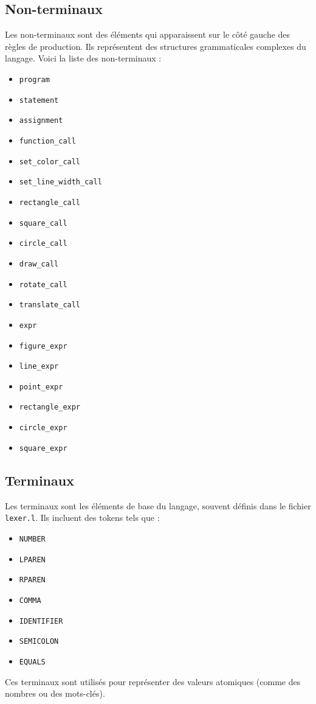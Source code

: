 \documentclass[12pt,a4paper]{article}
\begin{document}
\subsection{Non-terminaux}
Les non-terminaux sont des éléments qui apparaissent sur le côté gauche des règles de production. Ils représentent des structures grammaticales complexes du langage. Voici la liste des non-terminaux :
\begin{itemize}
    \item \texttt{program}
    \item \texttt{statement}
    \item \texttt{assignment}
    \item \texttt{function\_call}
    \item \texttt{set\_color\_call}
    \item \texttt{set\_line\_width\_call}
    \item \texttt{rectangle\_call}
    \item \texttt{square\_call}
    \item \texttt{circle\_call}
    \item \texttt{draw\_call}
    \item \texttt{rotate\_call}
    \item \texttt{translate\_call}
    \item \texttt{expr}
    \item \texttt{figure\_expr}
    \item \texttt{line\_expr}
    \item \texttt{point\_expr}
    \item \texttt{rectangle\_expr}
    \item \texttt{circle\_expr}
    \item \texttt{square\_expr}
\end{itemize}

\subsection{Terminaux}
Les terminaux sont les éléments de base du langage, souvent définis dans le fichier \texttt{lexer.l}. Ils incluent des tokens tels que :
\begin{itemize}
    \item \texttt{NUMBER}
    \item \texttt{LPAREN}
    \item \texttt{RPAREN}
    \item \texttt{COMMA}
    \item \texttt{IDENTIFIER}
    \item \texttt{SEMICOLON}
    \item \texttt{EQUALS}
\end{itemize}
Ces terminaux sont utilisés pour représenter des valeurs atomiques (comme des nombres ou des mots-clés).
\end{document}
